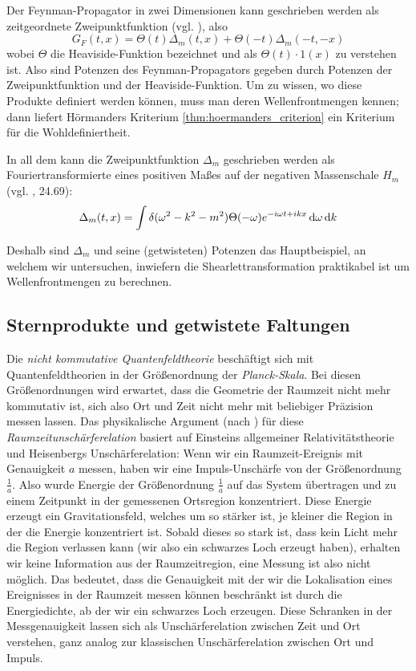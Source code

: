 Der Feynman-Propagator in zwei Dimensionen kann geschrieben werden als zeitgeordnete Zweipunktfunktion (vgl. \textcite{ReedSimon}), also
\begin{equation}
    G_F(t,x)
    =
    \Theta (t)\Delta_m(t,x) + \Theta(-t)\Delta_m(-t,-x)
    \label{eq:feynman_propgator_as_product}
\end{equation}
wobei $\Theta$ die Heaviside-Funktion bezeichnet und als $\Theta(t) \cdot 1(x)$ zu verstehen ist. Also sind Potenzen des Feynman-Propagators gegeben durch Potenzen der Zweipunktfunktion und der Heaviside-Funktion. Um zu wissen, wo diese Produkte definiert werden können, muss man deren Wellenfrontmengen kennen; dann liefert Hörmanders Kriterium \ref{thm:hoermanders_criterion} ein Kriterium für die Wohldefiniertheit.

In all dem kann die Zweipunktfunktion $\Delta_m$ geschrieben werden als Fouriertransformierte eines positiven Maßes auf der negativen Massenschale $H_m$ (vgl. \textcite{Schwartz2014}, 24.69):
\begin{equation}
    \Delta_m (t,x) = \int \delta (\omega^2-k^2-m^2)
                    \Theta(-\omega)e^{-i\omega t + i k x} \mathop{}\!\mathrm{d} \omega \mathop{}\!\mathrm{d} k
\label{eq:delta_m}
\end{equation}

Deshalb sind $\Delta_m$ und seine (getwisteten) Potenzen das Hauptbeispiel, an welchem wir untersuchen, inwiefern die Shearlettransformation praktikabel ist um Wellenfrontmengen zu berechnen.

\subsection{Sternprodukte und getwistete Faltungen}
\label{sec:sternprodukte}
Die \emph{nicht kommutative Quantenfeldtheorie} beschäftigt sich mit Quantenfeldtheorien in der Größenordnung der \emph{Planck-Skala}. Bei diesen Größenordnungen wird erwartet, dass die Geometrie der Raumzeit nicht mehr kommutativ ist, sich also Ort und Zeit nicht mehr mit beliebiger Präzision messen lassen. Das physikalische Argument (nach \textcite{Doplicher1995}) für diese \emph{Raumzeitunschärferelation} basiert auf Einsteins allgemeiner Relativitätstheorie und Heisenbergs Unschärferelation: Wenn wir ein Raumzeit-Ereignis mit Genauigkeit $a$ messen, haben wir eine Impuls-Unschärfe von der Größenordnung $\frac{1}{a}$. Also wurde Energie der Größenordnung $\frac{1}{a}$ auf das System übertragen und zu einem Zeitpunkt in der gemessenen Ortsregion konzentriert. Diese Energie erzeugt ein Gravitationsfeld, welches um so stärker ist, je kleiner die Region in der die Energie konzentriert ist. Sobald dieses so stark ist, dass kein Licht mehr die Region verlassen kann (wir also ein schwarzes Loch erzeugt haben), erhalten wir keine Information aus der Raumzeitregion, eine Messung ist also nicht möglich. Das bedeutet, dass die Genauigkeit mit der wir die Lokalisation eines Ereignisses in der Raumzeit messen können beschränkt ist durch die Energiedichte, ab der wir ein schwarzes Loch erzeugen. Diese Schranken in der Messgenauigkeit lassen sich als Unschärferelation zwischen Zeit und Ort verstehen, ganz analog zur klassischen Unschärferelation zwischen Ort und Impuls.

